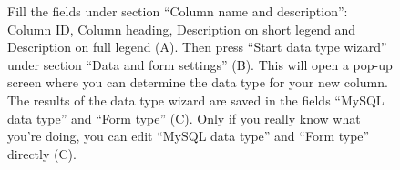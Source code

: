 \begin{figure}[ht]
  \begin{shaded}
		\caption{Fill the fields under section ``Column name and description'': Column ID, Column heading, Description on
		 short legend and Description on full legend (A).\newline
		Then press ``Start data type wizard'' under section ``Data and form settings'' (B). 
		This will open a pop-up screen where you can determine the data type for your new column.
		The results of the data type wizard are saved in the fields ``MySQL data type'' and ``Form type'' (C).\newline
		Only if you really know what you're doing, you can edit ``MySQL data type'' and ``Form type'' directly (C).}
		\label{fig:create_column_III}
  \end{shaded}
\end{figure}

